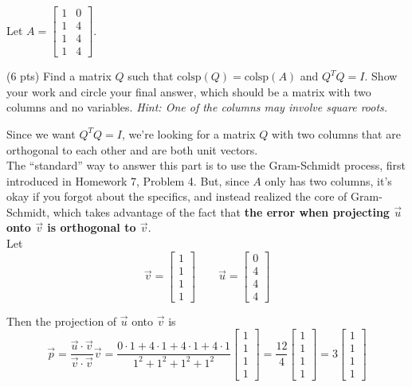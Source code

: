 \documentclass[11pt]{article}
\begin{document}
\newpage

\begin{prob}
Let $A = \begin{bmatrix} 1 & 0 \\ 1 & 4 \\ 1 & 4 \\ 1 & 4 \end{bmatrix}$.

\begin{subprob}(6 pts) Find a matrix $Q$ such that $\text{colsp}(Q) = \text{colsp}(A)$ and $Q^TQ = I$. Show your work and $\boxed{\text{circle}}$ your final answer, which should be a matrix with two columns and no variables. \textit{Hint: One of the columns may involve square roots.} \\

\emptybox{11cm}

\begin{solution}
Since we want $Q^TQ = I$, we're looking for a matrix $Q$ with two columns that are orthogonal to each other and are both unit vectors. \\

The ``standard'' way to answer this part is to use the Gram-Schmidt process, first introduced in Homework 7, Problem 4. But, since $A$ only has two columns, it's okay if you forgot about the specifics, and instead realized the core of Gram-Schmidt, which takes advantage of the fact that \textbf{the error when projecting $\vec u$ onto $\vec v$ is orthogonal to $\vec v$}. \\

Let
\[
\vec v = \begin{bmatrix} 1 \\ 1 \\ 1 \\ 1 \end{bmatrix}
\qquad
\vec u = \begin{bmatrix} 0 \\ 4 \\ 4 \\ 4 \end{bmatrix}
\]

Then the projection of $\vec u$ onto $\vec v$ is
\[
\vec p = \frac{\vec u \cdot \vec v}{\vec v \cdot \vec v}\vec v
= \frac{0\cdot 1 + 4\cdot 1 + 4\cdot 1 + 4\cdot 1}{1^2+1^2+1^2+1^2}
\begin{bmatrix} 1 \\ 1 \\ 1 \\ 1 \end{bmatrix}
= \frac{12}{4}
\begin{bmatrix} 1 \\ 1 \\ 1 \\ 1 \end{bmatrix}
= 3
\begin{bmatrix} 1 \\ 1 \\ 1 \\ 1 \end{bmatrix}
\]


\end{solution}
\end{subprob}
\end{prob}
\end{document}
